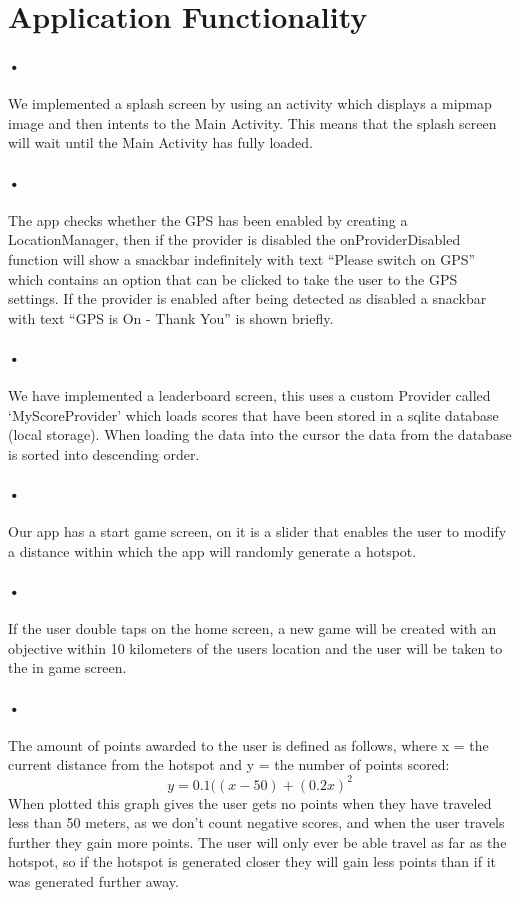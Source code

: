 \documentclass[10pt, a4paper]{article}
\begin{document}
\section*{Application Functionality}

\paragraph*{•}
We implemented a splash screen by using an activity which displays a mipmap image and then intents to the Main Activity. This means that the splash screen will wait until the Main Activity has fully loaded.

\paragraph*{•}
The app checks whether the GPS has been enabled by creating a LocationManager, then if the provider is disabled the onProviderDisabled function will show a snackbar indefinitely with text ``Please switch on GPS'' which contains an option that can be clicked to take the user to the GPS settings. If the provider is enabled after being detected as disabled a snackbar with text ``GPS is On - Thank You'' is shown briefly.
\paragraph*{•}
We have implemented a leaderboard screen, this uses a custom Provider called `MyScoreProvider' which loads scores that have been stored in a sqlite database (local storage). When loading the data into the cursor the data from the database is sorted into descending order.

\paragraph*{•}
Our app has a start game screen, on it is a slider that enables the user to modify a distance within which the app will randomly generate a hotspot.

\paragraph*{•}
If the user double taps on the home screen, a new game will be created with an objective within 10 kilometers of the users location and the user will be taken to the in game screen.

\paragraph*{•}
The amount of points awarded to the user is defined as follows, where x = the current distance from the hotspot and y = the number of points scored:
\[y = 0.1((x-50) + (0.2x)^2\]
When plotted this graph gives the user gets no points when they have traveled less than 50 meters, as we don't count negative scores, and when the user travels further they gain more points. The user will only ever be able travel as far as the hotspot, so if the hotspot is generated closer they will gain less points than if it was generated further away.
\end{document}
